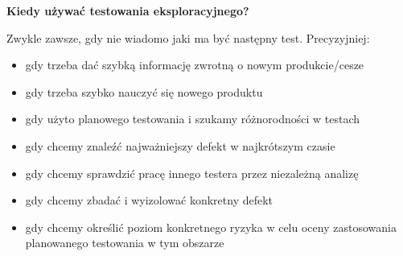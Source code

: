\documentclass[../main.tex]{subfiles}
\begin{document}
    \textbf{Kiedy używać testowania eksploracyjnego?}

    Zwykle zawsze, gdy nie wiadomo jaki ma być następny test. Precyzyjniej:
    \begin{itemize}
        \item gdy trzeba dać szybką informację zwrotną o nowym produkcie/cesze
        \item gdy trzeba szybko nauczyć się nowego produktu
        \item gdy użyto planowego testowania i szukamy różnorodności w testach
        \item gdy chcemy znaleźć najważniejszy defekt w najkrótszym czasie
        \item gdy chcemy sprawdzić pracę innego testera przez niezależną analizę
        \item gdy chcemy zbadać i wyizolować konkretny defekt
        \item gdy chcemy określić poziom konkretnego ryzyka w celu oceny zastosowania planowanego testowania w tym obszarze
    \end{itemize}
\end{document}
